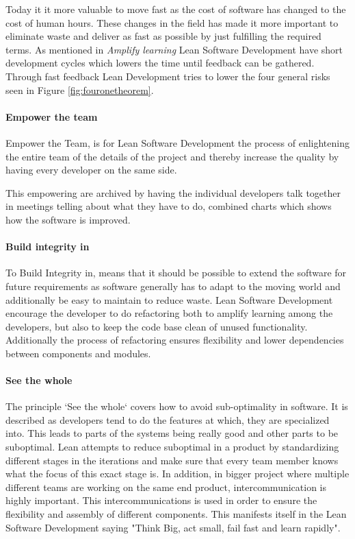 \documentclass{sig-alternate}
\begin{document}
Today it it more valuable to move fast as the cost of software has changed to the cost of human hours. 
These changes in the field has made it more important to eliminate waste and deliver as fast as possible 
by just fulfilling the required terms.
As mentioned in \textit{Amplify learning} Lean Software Development have short development cycles which 
lowers the time until feedback can be gathered. Through fast feedback Lean Development tries to lower 
the four general risks seen in Figure \ref{fig:fouronetheorem}.

\paragraph{Empower the team}
Empower the Team, is for Lean Software Development the process of enlightening the entire team of the 
details of the project and thereby increase the quality by having every developer on the same side. 

This empowering are archived by having the individual developers talk together in meetings telling
about what they have to do, combined charts which shows how the software is improved.

\paragraph{Build integrity in}
To Build Integrity in, means that it should be possible to extend the software for future requirements 
as software generally has to adapt to the moving world and additionally be easy to maintain to reduce waste.
Lean Software Development encourage the developer to do refactoring both to amplify learning among the 
developers, but also to keep the code base clean of unused functionality. 
Additionally the process of refactoring ensures flexibility and lower dependencies between components 
and modules.  

\paragraph{See the whole}
The principle `See the whole` covers how to avoid sub-optimality in software. 
It is described as developers tend to do the features at which, they are specialized into.
This leads to parts of the systems being really good and other parts to be suboptimal.
Lean attempts to reduce suboptimal in a product by standardizing different stages in the iterations and 
make sure that every team member knows what the focus of this exact stage is. 
In addition, in bigger project where multiple different teams are working on the same end product, 
intercommunication is highly important. 
This intercommunications is used in order to ensure the flexibility and assembly of different components. 
This manifests itself in the Lean Software Development \cite{poppendieck:lean} saying "Think Big, act small, fail fast and learn rapidly".
\end{document}

